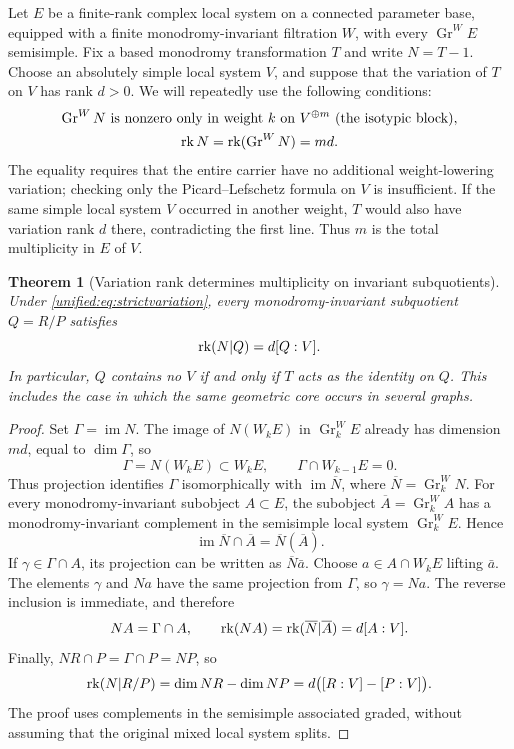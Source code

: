 \documentclass[11pt,a4paper,oneside]{article}
\theoremstyle{plain}
\newtheorem{theorem}{Theorem}[section]
\theoremstyle{definition}
\theoremstyle{remark}
\newcommand{\im}{\operatorname{im}}
\numberwithin{equation}{section}
\begin{document}
Let $E$ be a finite-rank complex local system on a connected parameter base, equipped with a finite monodromy-invariant filtration $W$,
with every $\operatorname{Gr}^W E$ semisimple. Fix a based monodromy transformation $T$ and write $N=T-1$.
Choose an absolutely simple local system $V$, and suppose that the variation of $T$ on $V$ has rank $d>0$.
We will repeatedly use the following conditions:
\begin{equation}\label{unified:eq:strictvariation}
 \begin{gathered}
 \operatorname{Gr}^W N\text{ is nonzero only in weight }k\text{ on }V^{\oplus m}
       \text{ (the isotypic block)},\\
 \operatorname{rk} N=\operatorname{rk}(\operatorname{Gr}^W N)=md.
 \end{gathered}
\end{equation}
The equality requires that the entire carrier have no additional weight-lowering variation; checking only the Picard--Lefschetz formula on $V$ is insufficient.
If the same simple local system $V$ occurred in another weight, $T$ would also have variation rank $d$ there, contradicting the first line.
Thus $m$ is the total multiplicity in $E$ of $V$.

\begin{theorem}[Variation rank determines multiplicity on invariant subquotients]\label{unified:thm:strictmultiplicity}
Under \eqref{unified:eq:strictvariation}, every monodromy-invariant subquotient $Q=R/P$ satisfies
\begin{equation}\label{unified:eq:rankmultiplicity}
 \operatorname{rk}(N|Q)=d[Q:V].
\end{equation}
In particular, $Q$ contains no $V$ if and only if $T$ acts as the identity on $Q$.
This includes the case in which the same geometric core occurs in several graphs.
\end{theorem}
\begin{proof}
Set $\Gamma=\im N$. The image of $N(W_kE)$ in $\operatorname{Gr}_k^WE$ already has dimension $md$,
equal to $\dim\Gamma$, so
\[
 \Gamma=N(W_kE)\subset W_kE,\qquad
 \Gamma\cap W_{k-1}E=0.
\]
Thus projection identifies $\Gamma$ isomorphically with $\im\overline N$, where
$\overline N=\operatorname{Gr}_k^WN$.
For every monodromy-invariant subobject $A\subset E$, the subobject $\overline A=\operatorname{Gr}_k^WA$
has a monodromy-invariant complement in the semisimple local system $\operatorname{Gr}_k^WE$. Hence
\[
 \im\overline N\cap\overline A=\overline N(\overline A).
\]
If $\gamma\in\Gamma\cap A$, its projection can be written as $\overline N\bar a$. Choose
$a\in A\cap W_kE$ lifting $\bar a$. The elements $\gamma$ and $Na$ have the same projection from $\Gamma$,
so $\gamma=Na$. The reverse inclusion is immediate, and therefore
\[
 NA=\Gamma\cap A,\qquad
 \operatorname{rk}(NA)=\operatorname{rk}(\overline N|\overline A)=d[A:V].
\]
Finally, $NR\cap P=\Gamma\cap P=NP$, so
\[
 \operatorname{rk}(N|R/P)=\dim NR-\dim NP
           =d\bigl([R:V]-[P:V]\bigr).
\]
The proof uses complements in the semisimple associated graded, without assuming that the original mixed local system splits.
\end{proof}
\end{document}

